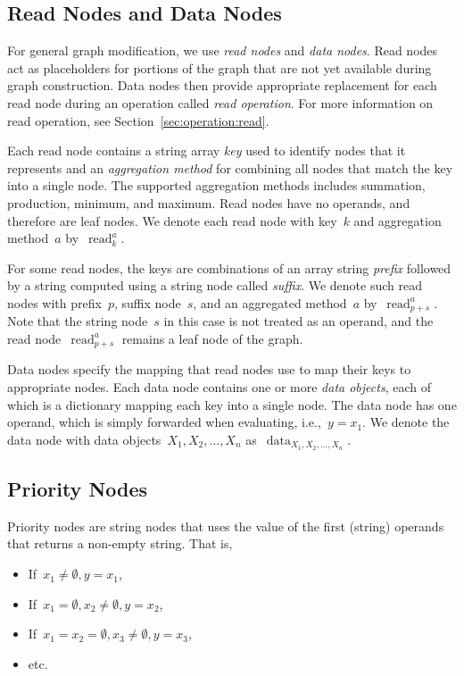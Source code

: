 \documentclass{article}
\DeclareMathOperator{\readNode}{read}
\DeclareMathOperator{\dataNode}{data}
\begin{document}
\subsection{Read Nodes and Data Nodes}

For general graph modification, we use \emph{read nodes} and \emph{data nodes}.
Read nodes act as placeholders for portions of the graph that are not yet available during graph construction.
Data nodes then provide appropriate replacement for each read node during an operation called \emph{read operation}.
For more information on read operation, see Section~\ref{sec:operation:read}.

Each read node contains a string array \emph{key} used to identify nodes that it represents and an \emph{aggregation method} for combining all nodes that match the key into a single node.
The supported aggregation methods includes summation, production, minimum, and maximum.
Read nodes have no operands, and therefore are leaf nodes.
We denote each read node with key~$k$ and aggregation method~$a$ by~$\readNode_k^a$.

For some read nodes, the keys are combinations of an array string \emph{prefix} followed by a string computed using a string node called \emph{suffix}.
We denote such read nodes with prefix~$p$, suffix node~$s$, and an aggregated method~$a$ by~$\readNode_{p+s}^a$.
Note that the string node~$s$ in this case is not treated as an operand, and the read node~$\readNode_{p+s}^a$ remains a leaf node of the graph.


Data nodes specify the mapping that read nodes use to map their keys to appropriate nodes.
Each data node contains one or more \emph{data objects}, each of which is a dictionary mapping each key into a single node.
The data node has one operand, which is simply forwarded when evaluating, i.e.,~$y = x_1$.
We denote the data node with data objects~$X_1, X_2, \dots, X_n$ as~$\dataNode_{X_1, X_2,\dots, X_n}$.

\subsection{Priority Nodes}

Priority nodes are string nodes that uses the value of the first (string) operands that returns a non-empty string.
That is,

\begin{itemize}
	\item If~$x_1 \neq \emptyset, y = x_1$,
	\item If~$x_1 = \emptyset, x_2\neq\emptyset, y = x_2$,
	\item If~$x_1 = x_2 = \emptyset, x_3\neq\emptyset, y = x_3$,
	\item etc.
\end{itemize}
\end{document}
